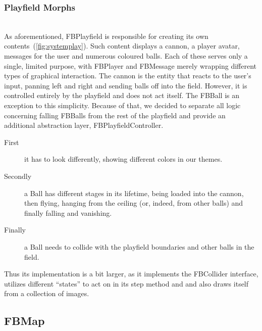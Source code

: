 \subsubsection{Playfield Morphs}~\\
As aforementioned, FBPlayfield is responsible for creating its own 
contents~(\ref{fig:systemplay}). Such content displays a cannon, a 
player avatar, messages for the user and numerous coloured balls. 
Each of these serves only a single, limited purpose, with FBPlayer 
and FBMessage merely wrapping different types of graphical interaction.
The cannon is the entity that reacts to the user's input, panning 
left and right and sending balls off into the field. However, it 
is controlled entirely by the playfield and does not act itself. 
The FBBall is an exception to this simplicity. 
Because of that, we decided to separate all logic concerning falling
FBBalls from the rest of the playfield and provide an additional
abstraction layer, FBPlayfieldController.


\begin{description}
  \item[First]
    	it has to look 
	differently, showing different colors in our themes. 
  \item[Secondly]
    	a Ball has different stages in its lifetime, being 
	loaded into the cannon, then flying, hanging from the 
	ceiling (or, indeed, from other balls) and finally falling 
	and vanishing.
  \item[Finally]
    	a Ball needs to collide with the playfield boundaries and 
	other balls in the field.
\end{description}
Thus its implementation is a bit larger, as it implements the FBCollider 
interface, utilizes different ``states'' to act on in its step method and 
and also draws itself from a collection of images.
%
\subsection{FBMap}

